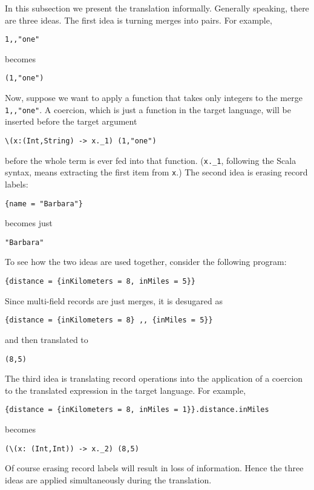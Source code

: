 In this subsection we present the translation informally. Generally speaking,
there are three ideas. The first idea is turning merges into pairs. For example,
\begin{lstlisting}
1,,"one"
\end{lstlisting}
becomes
\begin{lstlisting}
(1,"one")
\end{lstlisting}
Now, suppose we want to apply a function that takes only integers to the merge
\lstinline$1,,"one"$. A coercion, which is just a function in the target
language, will be inserted before the target argument
\begin{lstlisting}
\(x:(Int,String) -> x._1) (1,"one")
\end{lstlisting}
before the whole term is ever fed into that function.
(\lstinline{x._1}, following the Scala syntax, means extracting the first item
from \lstinline$x$.) The second idea is erasing record labels:
\begin{lstlisting}
{name = "Barbara"}
\end{lstlisting}
becomes just
\begin{lstlisting}
"Barbara"
\end{lstlisting}
To see how the two ideas are used together, consider the following program:
\begin{lstlisting}
{distance = {inKilometers = 8, inMiles = 5}}
\end{lstlisting}
Since multi-field records are just merges, it is desugared as
\begin{lstlisting}
{distance = {inKilometers = 8} ,, {inMiles = 5}}
\end{lstlisting}
and then translated to
\begin{lstlisting}
(8,5)
\end{lstlisting}
The third idea is translating record operations into the application of a
coercion to the translated expression in the target language. For example,
\begin{lstlisting}
{distance = {inKilometers = 8, inMiles = 1}}.distance.inMiles
\end{lstlisting}
becomes
\begin{lstlisting}
(\(x: (Int,Int)) -> x._2) (8,5)
\end{lstlisting}
Of course erasing record labels will result in loss of information. Hence the
three ideas are applied simultaneously during the translation.


